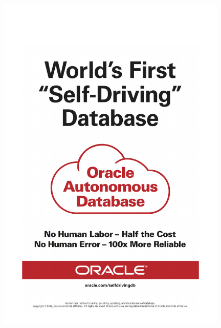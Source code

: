 
\begin{minipage}{\textwidth}

\thispagestyle{empty}
\vspace{-25mm}
\hspace*{-10mm}\includegraphics[width=110mm]{ads/oracle.pdf}
\end{minipage}

